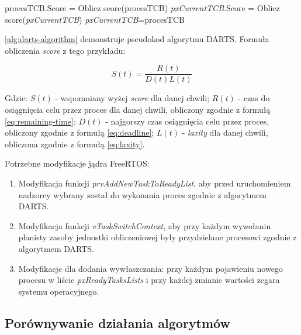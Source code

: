 \documentclass[../../main]{subfiles}
\begin{document}
\begin{algorithm}
\caption{Pseudokod algorytmu DARTS}\label{alg:darts-algorithm}
\begin{algorithmic}[1]
    \State procesTCB.Score = Oblicz score(procesTCB)
    \State \textit{pxCurrentTCB}.Score = Oblicz score(\textit{pxCurrentTCB})
        \State \textit{pxCurrentTCB}=procesTCB
    \EndIf
\EndFor
\end{algorithmic}
\end{algorithm}

\cref{alg:darts-algorithm} demonstruje pseudokod algorytmu DARTS. Formuła obliczenia \textit{score} z tego przykładu:

\large

\begin{equation}
    S(t) = \frac{R(t)}{D(t)L(t)}
    \label{eq:score}
\end{equation}

\normalsize

Gdzie: $S(t)$ - wspomniany wyżej \textit{score} dla danej chwili; $R(t)$ - czas do osiągnięcia celu przez proces dla danej chwili, obliczony zgodnie z formułą \eqref{eq:remaining-time}; $D(t)$ - najgorszy czas osiągnięcia celu przez proces, obliczony zgodnie z formułą \eqref{eq:deadline}; $L(t)$ - \textit{laxity} dla danej chwili, obliczona zgodnie z formułą \eqref{eq:laxity}.

Potrzebne modyfikacje jądra FreeRTOS:

\begin{enumerate}
    \item Modyfikacja funkcji \textit{prvAddNewTaskToReadyList}, aby przed uruchomieniem nadzorcy wybrany został do wykonania proces zgodnie z algorytmem DARTS.
    \item Modyfikacja funkcji \textit{vTaskSwitchContext}, aby przy każdym wywołaniu planisty zasoby jednostki obliczeniowej były przydzielane procesowi zgodnie z algorytmem DARTS.
    \item Modyfikacje dla dodania wywłaszczania: przy każdym pojawieniu nowego procesu w liście \textit{pxReadyTasksLists} i przy każdej zmianie wartości zegara systemu operacyjnego.
\end{enumerate}

\subsection{Porównywanie działania algorytmów}
\end{document}
